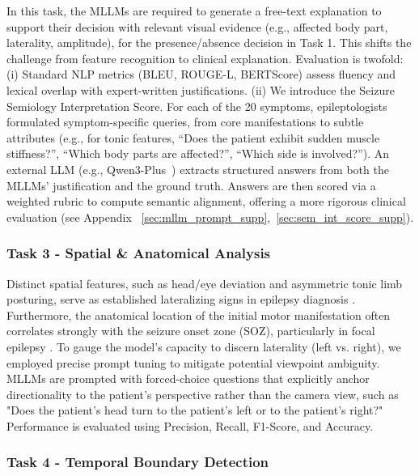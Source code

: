 \documentclass{article}
\theoremstyle{plain}
\theoremstyle{definition}
\theoremstyle{remark}
\begin{document}
In this task, the MLLMs are required to generate a free-text explanation to support their decision with relevant visual evidence (e.g., affected body part,  laterality, amplitude), for the presence/absence decision in Task 1. This shifts the challenge from feature recognition to clinical explanation. Evaluation is twofold: (i) Standard NLP metrics (BLEU, ROUGE-L, BERTScore) assess fluency and lexical overlap with expert-written justifications. (ii) We introduce the Seizure Semiology Interpretation Score. For each of the 20 symptoms, epileptologists formulated symptom-specific queries, from core manifestations to subtle attributes (e.g., for tonic features, “Does the patient exhibit sudden muscle stiffness?”, “Which body parts are affected?”, “Which side is involved?”). An external LLM (e.g., Qwen3-Plus~\cite{yang2025qwen3}) extracts structured answers from both the MLLMs' justification and the ground truth. Answers are then scored via a weighted rubric to compute semantic alignment, offering a more rigorous clinical evaluation (see Appendix ~\ref{sec:mllm_prompt_supp},~\ref{sec:sem_int_score_supp}).
\fi

\subsubsection{Task 3 - Spatial \& Anatomical Analysis}
\label{subsubsec:tasks3_metrics}

Distinct spatial features, such as head/eye deviation and asymmetric tonic limb posturing, serve as established lateralizing signs in epilepsy diagnosis \cite{kernan1993lateralizing, kotagal2000lateralizing}. Furthermore, the anatomical location of the initial motor manifestation often correlates strongly with the seizure onset zone (SOZ), particularly in focal epilepsy \cite{Chowdhury2021Localisation, bonini2012frontal}. To gauge the model's capacity to discern laterality (left vs. right), we employed precise prompt tuning to mitigate potential viewpoint ambiguity. MLLMs are prompted with forced-choice questions that explicitly anchor directionality to the patient's perspective rather than the camera view, such as "Does the patient's head turn to the patient's left or to the patient's right?" Performance is evaluated using Precision, Recall, F1-Score, and Accuracy.

\subsubsection{Task 4 - Temporal Boundary Detection}
\label{subsubsec:tasks4_metrics}
\end{document}
